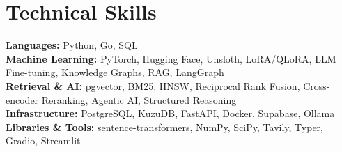 \documentclass[letterpaper,11pt]{article}
\begin{document}
\section{Technical Skills}
 \begin{itemize}[leftmargin=0.15in, label={}, parsep=0pt, itemsep=2pt, topsep=2pt]
    \small{\item{
     \textbf{Languages:}{ Python, Go, SQL} \\
     \textbf{Machine Learning:}{ PyTorch, Hugging Face, Unsloth, LoRA/QLoRA, LLM Fine-tuning, Knowledge Graphs, RAG, LangGraph} \\
     \textbf{Retrieval \& AI:}{ pgvector, BM25, HNSW, Reciprocal Rank Fusion, Cross-encoder Reranking, Agentic AI, Structured Reasoning} \\
     \textbf{Infrastructure:}{ PostgreSQL, KuzuDB, FastAPI, Docker, Supabase, Ollama} \\
     \textbf{Libraries \& Tools:}{ sentence-transformers, NumPy, SciPy, Tavily, Typer, Gradio, Streamlit}
    }}
 \end{itemize}
\end{document}
